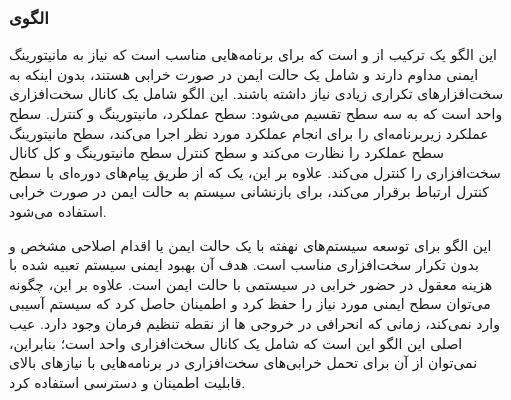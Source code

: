 \subsubsection{الگوی }
\label{ArmoushMix3LvlSafeMonSec}
\begin{RTL}
این الگو \cite{ref5}
یک ترکیب از 
و  است که برای برنامه‌هایی
مناسب است که نیاز به مانیتورینگ ایمنی مداوم دارند و شامل یک حالت
ایمن در صورت خرابی هستند، بدون اینکه به سخت‌افزارهای تکراری
زیادی نیاز داشته باشند. این الگو شامل یک کانال سخت‌افزاری
واحد است که به سه سطح تقسیم می‌شود: سطح عملکرد،
مانیتورینگ و کنترل. سطح عملکرد زیربرنامه‌ای را برای
انجام عملکرد مورد نظر اجرا می‌کند، سطح مانیتورینگ سطح عملکرد
را نظارت می‌کند و سطح کنترل سطح مانیتورینگ و کل کانال
سخت‌افزاری را کنترل می‌کند. علاوه بر این، یک  که
از طریق پیام‌های دوره‌ای با سطح کنترل ارتباط برقرار می‌کند،
برای بازنشانی سیستم به حالت ایمن در صورت خرابی استفاده می‌شود.
\end{RTL}
\begin{RTL}
این الگو برای توسعه سیستم‌های نهفته با یک حالت ایمن یا اقدام
اصلاحی مشخص و بدون تکرار سخت‌افزاری مناسب است.
هدف آن بهبود ایمنی سیستم تعبیه شده با هزینه معقول
در حضور خرابی در سیستمی با حالت ایمن است.
علاوه بر این، چگونه می‌توان سطح ایمنی مورد نیاز را حفظ کرد و
اطمینان حاصل کرد که سیستم آسیبی وارد نمی‌کند،
زمانی که انحرافی در خروجی ها از نقطه تنظیم فرمان وجود دارد.
عیب اصلی این الگو این است که شامل یک کانال سخت‌افزاری واحد
است؛ بنابراین، نمی‌توان از آن برای تحمل خرابی‌های سخت‌افزاری
در برنامه‌هایی با نیازهای بالای قابلیت اطمینان و دسترسی استفاده کرد.
\end{RTL}
